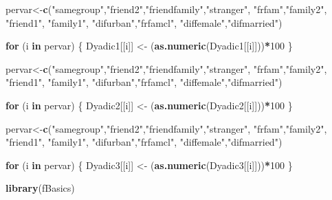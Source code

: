 \documentclass[]{article}
\newenvironment{Shaded}{\begin{snugshade}}{\end{snugshade}}
\newcommand{\KeywordTok}[1]{\textcolor[rgb]{0.13,0.29,0.53}{\textbf{#1}}}
\newcommand{\DecValTok}[1]{\textcolor[rgb]{0.00,0.00,0.81}{#1}}
\newcommand{\StringTok}[1]{\textcolor[rgb]{0.31,0.60,0.02}{#1}}
\newcommand{\ControlFlowTok}[1]{\textcolor[rgb]{0.13,0.29,0.53}{\textbf{#1}}}
\newcommand{\OperatorTok}[1]{\textcolor[rgb]{0.81,0.36,0.00}{\textbf{#1}}}
\newcommand{\NormalTok}[1]{#1}
\begin{document}
\begin{Shaded}
\begin{Highlighting}[]
\NormalTok{pervar<-}\KeywordTok{c}\NormalTok{(}\StringTok{"samegroup"}\NormalTok{,}\StringTok{"friend2"}\NormalTok{,}\StringTok{"friendfamily"}\NormalTok{,}\StringTok{"stranger"}\NormalTok{, }\StringTok{"frfam"}\NormalTok{,}\StringTok{"family2"}\NormalTok{, }\StringTok{"friend1"}\NormalTok{, }\StringTok{"family1"}\NormalTok{, }\StringTok{"difurban"}\NormalTok{,}\StringTok{"frfamcl"}\NormalTok{, }\StringTok{"diffemale"}\NormalTok{,}\StringTok{"difmarried"}\NormalTok{)}

\ControlFlowTok{for}\NormalTok{ (i }\ControlFlowTok{in}\NormalTok{ pervar) \{}
\NormalTok{Dyadic1[[i]] <-}\StringTok{ }\NormalTok{(}\KeywordTok{as.numeric}\NormalTok{(Dyadic1[[i]]))}\OperatorTok{*}\DecValTok{100}
\NormalTok{\}}


\NormalTok{pervar<-}\KeywordTok{c}\NormalTok{(}\StringTok{"samegroup"}\NormalTok{,}\StringTok{"friend2"}\NormalTok{,}\StringTok{"friendfamily"}\NormalTok{,}\StringTok{"stranger"}\NormalTok{, }\StringTok{"frfam"}\NormalTok{,}\StringTok{"family2"}\NormalTok{, }\StringTok{"friend1"}\NormalTok{, }\StringTok{"family1"}\NormalTok{, }\StringTok{"difurban"}\NormalTok{,}\StringTok{"frfamcl"}\NormalTok{, }\StringTok{"diffemale"}\NormalTok{,}\StringTok{"difmarried"}\NormalTok{)}

\ControlFlowTok{for}\NormalTok{ (i }\ControlFlowTok{in}\NormalTok{ pervar) \{}
\NormalTok{Dyadic2[[i]] <-}\StringTok{ }\NormalTok{(}\KeywordTok{as.numeric}\NormalTok{(Dyadic2[[i]]))}\OperatorTok{*}\DecValTok{100}
\NormalTok{\}}

\NormalTok{pervar<-}\KeywordTok{c}\NormalTok{(}\StringTok{"samegroup"}\NormalTok{,}\StringTok{"friend2"}\NormalTok{,}\StringTok{"friendfamily"}\NormalTok{,}\StringTok{"stranger"}\NormalTok{, }\StringTok{"frfam"}\NormalTok{,}\StringTok{"family2"}\NormalTok{, }\StringTok{"friend1"}\NormalTok{, }\StringTok{"family1"}\NormalTok{, }\StringTok{"difurban"}\NormalTok{,}\StringTok{"frfamcl"}\NormalTok{, }\StringTok{"diffemale"}\NormalTok{,}\StringTok{"difmarried"}\NormalTok{)}

\ControlFlowTok{for}\NormalTok{ (i }\ControlFlowTok{in}\NormalTok{ pervar) \{}
\NormalTok{Dyadic3[[i]] <-}\StringTok{ }\NormalTok{(}\KeywordTok{as.numeric}\NormalTok{(Dyadic3[[i]]))}\OperatorTok{*}\DecValTok{100}
\NormalTok{\}}
\end{Highlighting}
\end{Shaded}

\begin{Shaded}
\begin{Highlighting}[]
\KeywordTok{library}\NormalTok{(fBasics)}
\end{Highlighting}
\end{Shaded}
\end{document}
